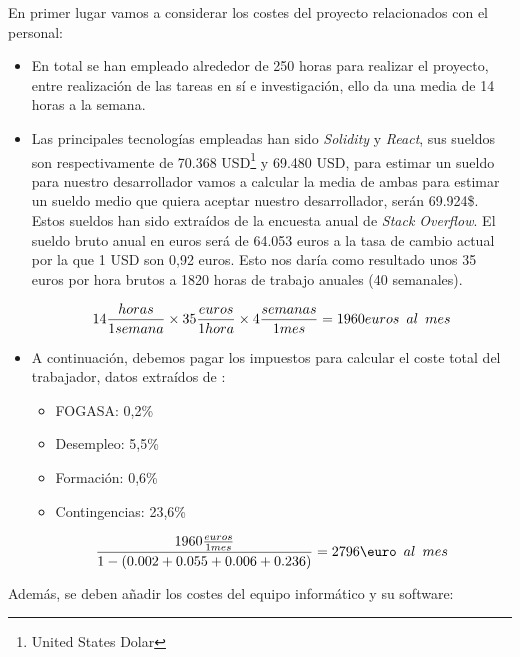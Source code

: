 En primer lugar vamos a considerar los costes del proyecto relacionados con el personal:

\begin{itemize}
    \item En total se han empleado alrededor de 250 horas para realizar el proyecto, entre realización de las tareas en sí e investigación, ello da una media de 14 horas a la semana.
    \item Las principales tecnologías empleadas han sido \textit{Solidity} y \textit{React}, sus sueldos son respectivamente de 70.368 USD\footnote{United States Dolar} y 69.480 USD, para estimar un sueldo para nuestro desarrollador vamos a calcular la media de ambas para estimar un sueldo medio que quiera aceptar nuestro desarrollador, serán 69.924\$. Estos sueldos han sido extraídos de la encuesta anual de \textit{Stack Overflow}\cite{stackoverflowsurvey}. El sueldo bruto anual en euros será de 64.053 euros a la tasa de cambio actual por la que 1 USD son 0,92 euros. Esto nos daría como resultado unos 35 euros por hora brutos a 1820 horas de trabajo anuales (40 semanales).

 $$ 14 \frac{horas}{ 1 semana}\times35 \frac{euros}{ 1 hora}\times4\frac{semanas}{ 1 mes}= 1960 euros\hspace{0.5em}al\hspace{0.5em}mes  $$

\item A continuación, debemos pagar los impuestos para calcular el coste total del trabajador, datos extraídos de \cite{impuestosSS}:
\begin{itemize}
    \item FOGASA: 0,2\%
    \item Desempleo: 5,5\%
    \item Formación: 0,6\%
    \item Contingencias: 23,6\%
\end{itemize}

$$\frac{1960\frac{euros}{ 1 mes}}{1-(0.002+0.055+0.006+0.236)}=2796\text{\euro}\hspace{0.5em}al\hspace{0.5em}mes$$
\end{itemize}
Además, se deben añadir los costes del equipo informático y su software:
